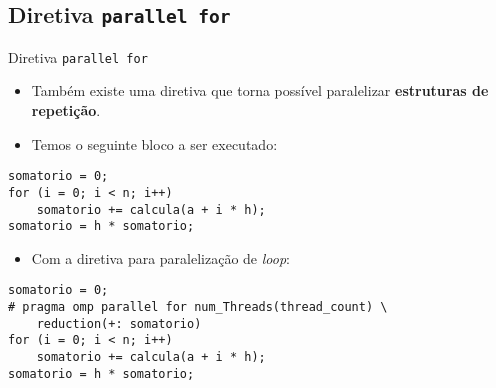 \subsection{Diretiva {\tt parallel for}}

\begin{frame}[fragile]{Diretiva {\tt parallel for}}
	\begin{itemize}
		\item Também existe uma diretiva que torna possível paralelizar {\bf estruturas de repetição}.
				\pause
		\item Temos o seguinte bloco a ser executado:
	\end{itemize}



\begin{lstlisting}
somatorio = 0;
for (i = 0; i < n; i++)
	somatorio += calcula(a + i * h); 
somatorio = h * somatorio;
\end{lstlisting}

		\pause

	\begin{itemize}
		\item Com a diretiva para paralelização de \textit{loop}:
	\end{itemize}


\begin{lstlisting}
somatorio = 0;
# pragma omp parallel for num_Threads(thread_count) \
	reduction(+: somatorio) 
for (i = 0; i < n; i++)
	somatorio += calcula(a + i * h); 
somatorio = h * somatorio;
\end{lstlisting}

\end{frame}




